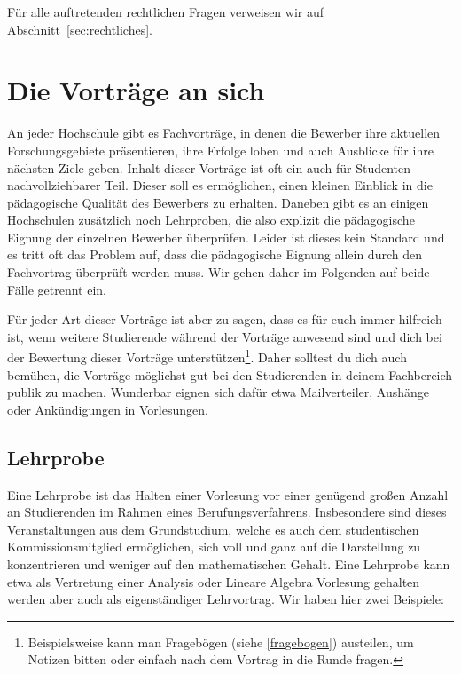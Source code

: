 \documentclass[10pt,twoside,a5paper,openright]{book}
\begin{document}
Für alle auftretenden rechtlichen Fragen verweisen wir auf Abschnitt~\ref{sec:rechtliches}.


\section{Die Vorträge an sich}
An jeder Hochschule gibt es Fachvorträge, in denen die Bewerber ihre aktuellen Forschungsgebiete präsentieren, ihre Erfolge loben und auch Ausblicke für ihre nächsten Ziele geben. Inhalt dieser Vorträge ist oft ein auch für Studenten nachvollziehbarer Teil. Dieser soll es ermöglichen, einen kleinen Einblick in die pädagogische Qualität des Bewerbers zu erhalten. Daneben gibt es an einigen Hochschulen zusätzlich noch Lehrproben, die also explizit die pädagogische Eignung der einzelnen Bewerber überprüfen. Leider ist dieses kein Standard und es tritt oft das Problem auf, dass die pädagogische Eignung allein durch den Fachvortrag überprüft werden muss. Wir gehen daher im Folgenden auf beide Fälle getrennt ein. 

Für jeder Art dieser Vorträge ist aber zu sagen, dass es für euch immer hilfreich ist, wenn weitere Studierende während der Vorträge anwesend sind und dich bei der Bewertung dieser Vorträge unterstützen\footnote{Beispielsweise kann man Fragebögen (siehe \ref{fragebogen}) austeilen, um Notizen bitten oder einfach nach dem Vortrag in die Runde fragen.}. Daher solltest du dich auch bemühen, die Vorträge möglichst gut bei den Studierenden in deinem Fachbereich publik zu machen. Wunderbar eignen sich dafür etwa Mailverteiler, Aushänge oder Ankündigungen in Vorlesungen.

\subsection{Lehrprobe}
Eine Lehrprobe ist das Halten einer Vorlesung vor einer genügend großen Anzahl an Studierenden im Rahmen eines Berufungsverfahrens. Insbesondere sind dieses Veranstaltungen aus dem Grundstudium, welche es auch dem studentischen Kommissionsmitglied ermöglichen, sich voll und ganz auf die Darstellung zu konzentrieren und weniger auf den mathematischen Gehalt. Eine Lehrprobe kann etwa als Vertretung einer Analysis oder Lineare Algebra Vorlesung gehalten werden aber auch als eigenständiger Lehrvortrag. Wir haben hier zwei Beispiele:
\end{document}

